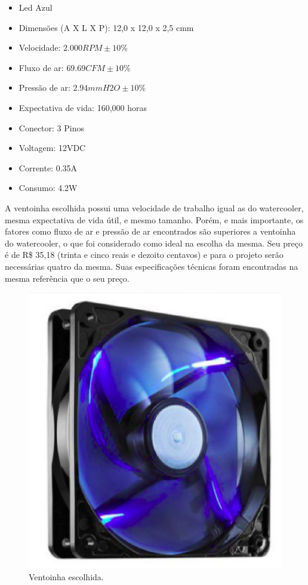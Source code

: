 \begin{itemize}
\item Led Azul
\item Dimensões (A X L X P): 12,0 x 12,0 x 2,5 cmm
\item Velocidade: $2.000 RPM \pm 10$\%
\item Fluxo de ar: $69.69 CFM \pm 10$\%
\item Pressão de ar: $2.94 mmH2O \pm 10$\%
\item Expectativa de vida: 160,000 horas
\item Conector: 3 Pinos
\item Voltagem: 12VDC
\item Corrente: 0.35A
\item Consumo: 4.2W
\end{itemize}

A ventoinha escolhida possui uma velocidade de trabalho igual as do watercooler, mesma expectativa de vida útil, e mesmo tamanho. Porém, e mais importante, os fatores como fluxo de ar e pressão de ar encontrados são superiores a ventoinha do watercooler, o que foi considerado como ideal na escolha da mesma. Seu preço é de R\$ 35,18 (trinta e cinco reais e dezoito centavos) e para o projeto serão necessárias quatro da mesma. Suas especificações técnicas foram encontradas na mesma referência que o seu preço.

\begin{figure}[!htb]                                                               
   \centering                                                                      
   \includegraphics[scale=0.4, keepaspectratio=true]{figuras/ventoinha.eps}
   \caption{Ventoinha escolhida.}               
\end{figure}



